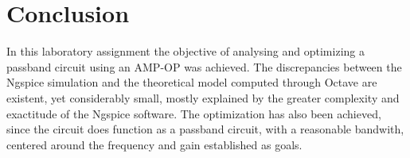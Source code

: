 \section{Conclusion}
\label{sec:conclusion}

In this laboratory assignment the objective of analysing and optimizing a passband circuit using an AMP-OP was achieved. The discrepancies between the Ngspice simulation and the theoretical model computed through Octave are existent, yet considerably small, mostly explained by the greater complexity and exactitude of the Ngspice software. The optimization has also been achieved, since the circuit does function as a passband circuit, with a reasonable bandwith, centered around the frequency and gain established as goals.

